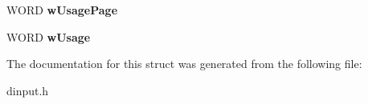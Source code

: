 \begin{DoxyCompactItemize}
\item 
\hypertarget{struct_d_i_d_e_v_i_c_e_i_n_s_t_a_n_c_e_w_a058b479fafe53772e312f56fb70077a6}{W\-O\-R\-D {\bfseries w\-Usage\-Page}}\label{struct_d_i_d_e_v_i_c_e_i_n_s_t_a_n_c_e_w_a058b479fafe53772e312f56fb70077a6}

\item 
\hypertarget{struct_d_i_d_e_v_i_c_e_i_n_s_t_a_n_c_e_w_acb2a8214708cf192c6ca239db47bc485}{W\-O\-R\-D {\bfseries w\-Usage}}\label{struct_d_i_d_e_v_i_c_e_i_n_s_t_a_n_c_e_w_acb2a8214708cf192c6ca239db47bc485}

\end{DoxyCompactItemize}


The documentation for this struct was generated from the following file\-:\begin{DoxyCompactItemize}
\item 
dinput.\-h\end{DoxyCompactItemize}
